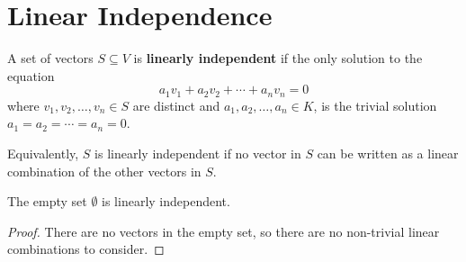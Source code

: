 \section{Linear Independence}

\begin{definition}
  \label{definition : linear_independent}
  \leanok
  A set of vectors $S \subseteq V$ is \textbf{linearly independent} if the only solution to the equation
  $$a_1 v_1 + a_2 v_2 + \cdots + a_n v_n = 0$$
  where $v_1, v_2, \ldots, v_n \in S$ are distinct and $a_1, a_2, \ldots, a_n \in K$, is the trivial solution $a_1 = a_2 = \cdots = a_n = 0$.
  
  Equivalently, $S$ is linearly independent if no vector in $S$ can be written as a linear combination of the other vectors in $S$.
\end{definition}

\begin{theorem}
  \label{theorem : linear_independent_empty}
  \leanok
  The empty set $\emptyset$ is linearly independent.
\end{theorem}

\begin{proof}
  There are no vectors in the empty set, so there are no non-trivial linear combinations to consider.
\end{proof}